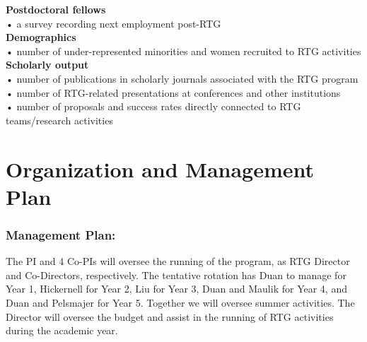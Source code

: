 \documentclass[11pt]{NSFamsart}
\begin{document}
\noindent
\textbf{Postdoctoral fellows}\\
• a survey recording next employment post-RTG     \\

\noindent
\textbf{Demographics}\\
• number of under-represented minorities and women recruited to   RTG activities \\

\noindent
\textbf{Scholarly output}\\
• number of publications in scholarly journals associated with the RTG program\\
• number of RTG-related presentations at conferences and other institutions\\
• number of proposals and success rates directly connected to RTG teams/research activities

 


\section{Organization and Management Plan }
 

 
\subsubsection*{Management Plan:}
 The PI and 4 Co-PIs will oversee the running of the program, as RTG Director  and Co-Directors, respectively.  The tentative rotation has Duan to manage for Year 1, Hickernell for Year 2,    Liu for  Year 3,    Duan and Maulik for Year 4, and Duan and Pelsmajer for Year 5.   Together we     will oversee summer activities.  
The Director will oversee
the budget and assist in the running of RTG activities during the academic year. 

\end{document}

